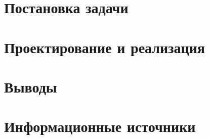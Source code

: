 \documentclass[a4paper]{article}
\author{Буренин А.А}
\begin{document}

    \tableofcontents{}
    \clearpage

    \section{Постановка задачи}
    \blindtext

    \section{Проектирование и реализация}
    \blindtext
    \section{Выводы}
    \blindtext

    \section{Информационные источники}
    \blindtext
\end{document}
